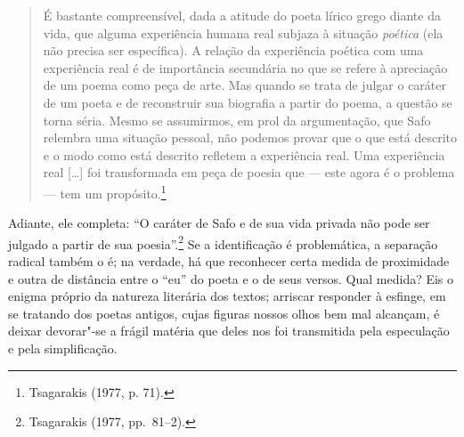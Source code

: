 \begin{quote}
É bastante compreensível, dada a atitude do poeta lírico grego diante da vida,
que alguma experiência humana real subjaza à situação \textit{poética} (ela não
precisa ser específica). A relação da experiência poética com uma experiência
real é de importância secundária no que se refere à apreciação de um poema como
peça de arte. Mas quando se trata de julgar o caráter de um poeta e de
reconstruir sua biografia a partir do poema, a questão se torna séria. Mesmo se
assumirmos, em prol da argumentação, que Safo relembra uma situação pessoal,
não podemos provar que o que está descrito e o modo como está descrito refletem
a experiência real. Uma experiência real [\ldots{}] foi transformada em peça de
poesia que --- este agora é o problema --- tem um propósito.\footnote{ Tsagarakis (1977, p. 71).}
\end{quote}

Adiante, ele completa: “O caráter de Safo e de sua vida privada não pode ser
julgado a partir de sua poesia”.\footnote{ Tsagarakis (1977, pp.~81--2).} Se a identificação é problemática,
a separação radical também o é; na verdade, há que reconhecer certa medida de
proximidade e outra de distância entre o “eu” do poeta e o de seus versos. Qual
medida? Eis o enigma próprio da natureza literária dos textos; arriscar
responder à esfinge, em se tratando dos poetas antigos, cujas figuras nossos
olhos bem mal alcançam, é deixar devorar"-se a frágil matéria que deles nos foi
transmitida pela especulação e pela simplificação.

